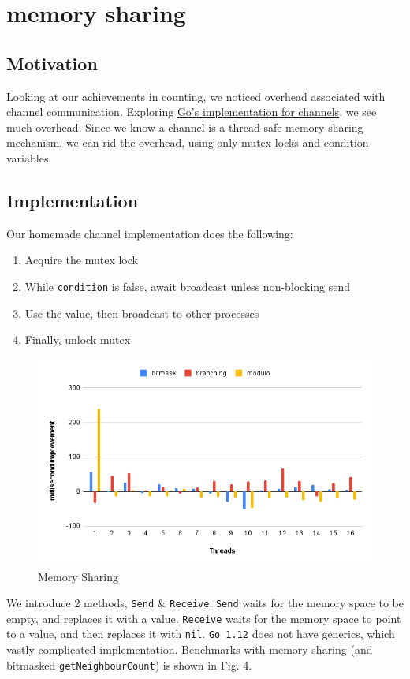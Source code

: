 \documentclass[twoside,twocolumn]{article}
\begin{document}
\section{memory sharing}
\subsection{Motivation}
Looking at our achievements in counting, we noticed overhead associated with channel communication.
Exploring \href{https://github.com/golang/go/blob/4fc9565ffce91c4299903f7c17a275f0786734a1/src/runtime/chan.go}
{Go's implementation for channels}, we see much overhead. Since we know a channel is a thread-safe memory sharing
mechanism, we can rid the overhead, using only mutex locks and condition variables.
\subsection{Implementation}
Our homemade channel implementation does the following:
\begin{enumerate}[noitemsep]
  \item Acquire the mutex lock
  \item While \texttt{condition} is false, await broadcast unless non-blocking send
  \item Use the value, then broadcast to other processes
  \item Finally, unlock mutex
\end{enumerate}
\begin{figure}
  \includegraphics[width=\linewidth]{memshare.png}
  \caption{Memory Sharing}
  \label{fig:chart4}
\end{figure}
We introduce 2 methods, \texttt{Send} \& \texttt{Receive}. \texttt{Send} waits for the memory space 
to be empty, and replaces it with a value. \texttt{Receive} waits for the memory space to point to a value, and then 
replaces it with \texttt{nil}. \texttt{Go 1.12} does not have generics, which vastly complicated implementation. 
Benchmarks with memory sharing (and bitmasked \texttt{getNeighbourCount}) is shown in Fig. 4.
\end{document}
